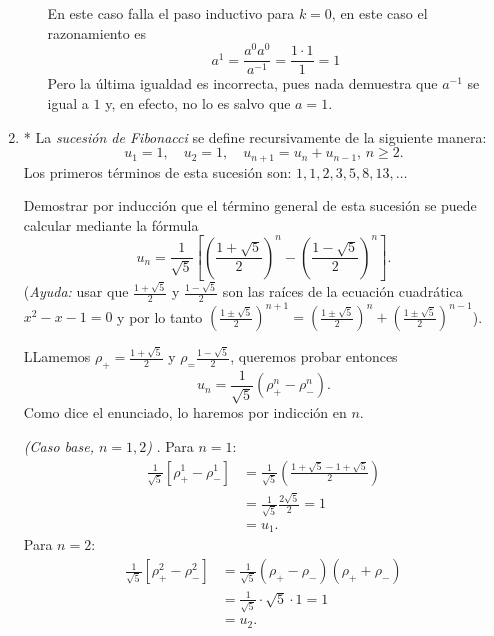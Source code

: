 \begin{enumerate}
\begin{enumerate}
        \rta En  este caso falla el paso inductivo para $k=0$,  en este caso el razonamiento es
        \begin{equation*}
            a^{1}= \frac{a^0 a^0}{a^{-1}}=\frac{1\cdot1}1=1
        \end{equation*}
        Pero la última igualdad es incorrecta, pues nada demuestra que $a^{-1}$  se igual a $1$ y, en efecto, no lo es salvo que  $a=1$. 
    \end{enumerate}

    \item * La \emph{sucesión de Fibonacci} se define recursivamente de la siguiente manera:
    $$
    u_1=1,\quad u_2=1,\quad u_{n+1}=u_{n}+u_{n-1}, \, n\geq 2.
    $$
    Los primeros términos de esta sucesión son: $1,1,2,3,5,8,13,\ldots$
    
    Demostrar por inducción que el término general de esta sucesión se puede calcular mediante la fórmula
    $$
    u_n= \frac{1}{\sqrt{5}}\left[\left(\frac{1+\sqrt{5}}{2}\right)^n-\left(\frac{1-\sqrt{5}}{2}\right)^n\right].
    $$
    (\textit{Ayuda:} usar que $\frac{1+\sqrt{5}}{2}$ y $\frac{1-\sqrt{5}}{2}$ son las raíces de la ecuación cuadrática $x^2-x-1=0$ y por lo tanto  $\left(\frac{1\pm\sqrt{5}}{2}\right)^{n+1} = \left(\frac{1\pm\sqrt{5}}{2}\right)^{n}+\left(\frac{1\pm\sqrt{5}}{2}\right)^{n-1}$).

    \rta LLamemos $\rho_+ = \frac{1+\sqrt{5}}{2}$ y $\rho_ = \frac{1-\sqrt{5}}{2}$,  queremos probar entonces
    \begin{equation}
        u_n= \frac{1}{\sqrt{5}}(\rho_+^n - \rho_-^n). \tag{$P_n$}
    \end{equation}
    Como dice el enunciado, lo haremos por indicción en $n$.

    \textit{(Caso  base, $n=1,2$) }. Para $n=1$:
    \begin{align*}
        \frac{1}{\sqrt{5}}\left[\rho_+^1-\rho_-^1\right]    &=  \frac{1}{\sqrt{5}}\left(\frac{1+\sqrt{5}- 1+\sqrt{5}}{2}\right) \\
        &=  \frac{1}{\sqrt{5}}\frac{2\sqrt{5}}{2} = 1 \\
        &= u_1. 
    \end{align*}
    Para $n=2$: 
    \begin{align*}
        \frac{1}{\sqrt{5}}\left[\rho_+^2-\rho_-^2\right]  &=  \frac{1}{\sqrt{5}}(\rho_+-\rho_-)(\rho_++\rho_-) \\
        &= \frac{1}{\sqrt{5}}\cdot \sqrt{5} \cdot 1 = 1\\
        &= u_2. 
    \end{align*}
    

\end{enumerate}
